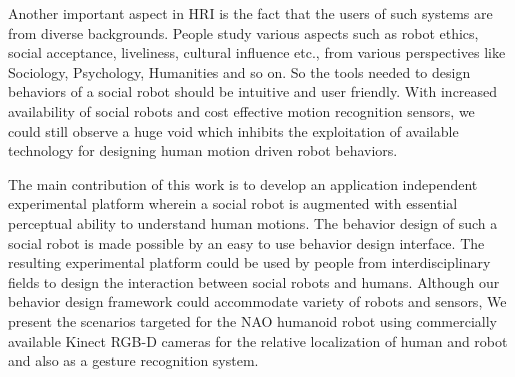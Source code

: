 \documentclass{llncs}
\begin{document}
%
Another important aspect in HRI is the fact that the users of such systems are from diverse backgrounds. People study various aspects such as robot ethics, social acceptance, liveliness, cultural influence etc., from various perspectives like Sociology, Psychology, Humanities and so on. So the tools needed to design behaviors of a social robot should be intuitive and user friendly.  With increased availability of social robots and cost effective motion recognition sensors, we could still observe a huge void which inhibits the exploitation of available technology for designing human motion driven robot behaviors.

The main contribution of this work is to develop an application independent experimental platform wherein a social robot is augmented with essential perceptual ability to understand human motions. The behavior design of such a social robot is made possible by an easy to use behavior design interface. The resulting experimental platform could be used by people from interdisciplinary fields to design the interaction between social robots and humans. Although our behavior design framework could accommodate variety of robots and sensors, We present the scenarios targeted for the NAO \cite{NaoTheRobot} humanoid robot using commercially available Kinect \cite{Kinect2014} RGB-D cameras for the relative localization of human and robot and also as a gesture recognition system. 
\end{document}
